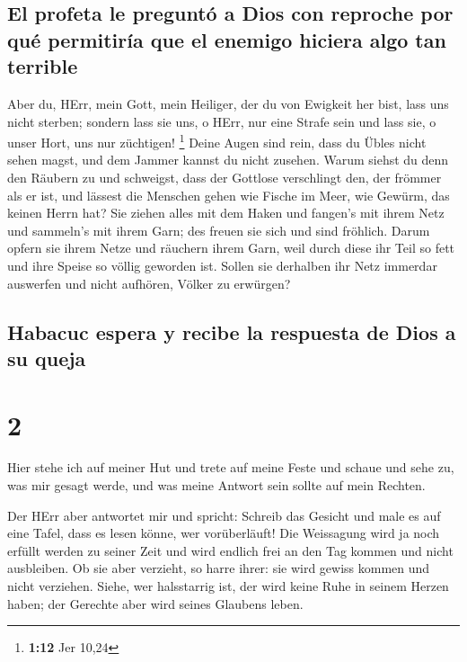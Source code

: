 \hypertarget{el-profeta-le-preguntuxf3-a-dios-con-reproche-por-quuxe9-permitiruxeda-que-el-enemigo-hiciera-algo-tan-terrible}{%
\subsection{El profeta le preguntó a Dios con reproche por qué
permitiría que el enemigo hiciera algo tan
terrible}\label{el-profeta-le-preguntuxf3-a-dios-con-reproche-por-quuxe9-permitiruxeda-que-el-enemigo-hiciera-algo-tan-terrible}}

 Aber du, HErr, mein Gott, mein Heiliger, der du von
Ewigkeit her bist, lass uns nicht sterben; sondern lass sie uns, o HErr,
nur eine Strafe sein und lass sie, o unser Hort, uns nur züchtigen!
\footnote{\textbf{1:12} Jer 10,24}  Deine Augen sind
rein, dass du Übles nicht sehen magst, und dem Jammer kannst du nicht
zusehen. Warum siehst du denn den Räubern zu und schweigst, dass der
Gottlose verschlingt den, der frömmer als er ist,  und
lässest die Menschen gehen wie Fische im Meer, wie Gewürm, das keinen
Herrn hat?  Sie ziehen alles mit dem Haken und fangen's
mit ihrem Netz und sammeln's mit ihrem Garn; des freuen sie sich und
sind fröhlich.  Darum opfern sie ihrem Netze und räuchern
ihrem Garn, weil durch diese ihr Teil so fett und ihre Speise so völlig
geworden ist.  Sollen sie derhalben ihr Netz immerdar
auswerfen und nicht aufhören, Völker zu erwürgen?

\hypertarget{habacuc-espera-y-recibe-la-respuesta-de-dios-a-su-queja}{%
\subsection{Habacuc espera y recibe la respuesta de Dios a su
queja}\label{habacuc-espera-y-recibe-la-respuesta-de-dios-a-su-queja}}

\hypertarget{section-1}{%
\section{2}\label{section-1}}

 Hier stehe ich auf meiner Hut und trete auf meine Feste
und schaue und sehe zu, was mir gesagt werde, und was meine Antwort sein
sollte auf mein Rechten.

 Der HErr aber antwortet mir und spricht: Schreib das
Gesicht und male es auf eine Tafel, dass es lesen könne, wer
vorüberläuft!  Die Weissagung wird ja noch erfüllt werden
zu seiner Zeit und wird endlich frei an den Tag kommen und nicht
ausbleiben. Ob sie aber verzieht, so harre ihrer: sie wird gewiss kommen
und nicht verziehen.  Siehe, wer halsstarrig ist, der wird
keine Ruhe in seinem Herzen haben; der Gerechte aber wird seines
Glaubens leben.

